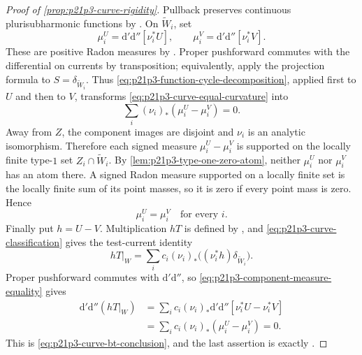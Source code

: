 \begin{proof}[Proof of \cref{prop:p21p3-curve-rigidity}]
Pullback preserves continuous plurisubharmonic functions by
\cite[Proposition~8.1.5]{CLD25}.  On \(\widetilde W_i\), set
\[
 \mu_i^U=\mathrm d'\mathrm d''[\nu_i^*U],
 \qquad
 \mu_i^V=\mathrm d'\mathrm d''[\nu_i^*V].
\]
These are positive Radon measures by
\cite[Lemma~8.5.5]{CLD25}.  Proper pushforward commutes with the
differential on currents by transposition; equivalently, apply the
projection formula \cite[Proposition~8.5.6]{CLD25} to
\(S=\delta_{\widetilde W_i}\).  Thus
\eqref{eq:p21p3-function-cycle-decomposition}, applied first to \(U\)
and then to \(V\), transforms
\eqref{eq:p21p3-curve-equal-curvature} into
\begin{equation}
\label{eq:p21p3-component-measure-sum}
                    \sum_i(\nu_i)_*(\mu_i^U-\mu_i^V)=0.
\end{equation}
Away from \(Z\), the component images are disjoint and \(\nu_i\) is an
analytic isomorphism.  Therefore each signed measure
\(\mu_i^U-\mu_i^V\) is supported on the locally finite type-$1$ set
\(Z_i\cap\widetilde W_i\).  By
\cref{lem:p21p3-type-one-zero-atom}, neither \(\mu_i^U\) nor
\(\mu_i^V\) has an atom there.  A signed Radon measure supported on a
locally finite set is the locally finite sum of its point masses, so it
is zero if every point mass is zero.  Hence
\begin{equation}
\label{eq:p21p3-component-measure-equality}
                              \mu_i^U=\mu_i^V
                              \quad\text{for every }i.
\end{equation}
Finally put \(h=U-V\).  Multiplication \(hT\) is defined by
\cite[Example~7.2.12]{CLD25}, and
\eqref{eq:p21p3-curve-classification} gives the test-current identity
\[
 hT|_W=\sum_i c_i(\nu_i)_*
       \bigl((\nu_i^*h)\delta_{\widetilde W_i}\bigr).
\]
Proper pushforward commutes with \(\mathrm d'\mathrm d''\), so
\eqref{eq:p21p3-component-measure-equality} gives
\begin{align*}
 \mathrm d'\mathrm d''(hT|_W)
 &=\sum_i c_i(\nu_i)_*
       \mathrm d'\mathrm d''[\nu_i^*U-\nu_i^*V] \\
 &=\sum_i c_i(\nu_i)_*(\mu_i^U-\mu_i^V)=0.
\end{align*}
This is \eqref{eq:p21p3-curve-bt-conclusion}, and the last assertion is
exactly \cite[Definition~8.6.2]{CLD25}.
\end{proof}
